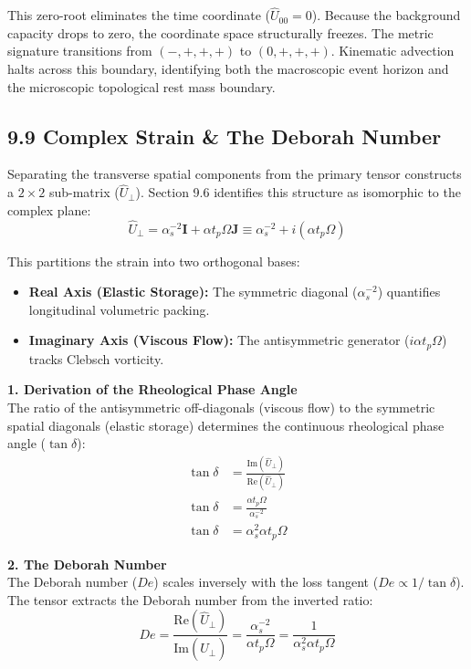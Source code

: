 This zero-root eliminates the time coordinate ($\hat{U}_{00} = 0$). Because the background capacity drops to zero, the coordinate space structurally freezes. The metric signature transitions from $(-,+,+,+)$ to $(0,+,+,+)$. Kinematic advection halts across this boundary, identifying both the macroscopic event horizon and the microscopic topological rest mass boundary.

\subsection*{9.9 Complex Strain \& The Deborah Number} 

Separating the transverse spatial components from the primary tensor constructs a $2 \times 2$ sub-matrix ($\hat{U}_{\perp}$). Section 9.6 identifies this structure as isomorphic to the complex plane:
\begin{equation}
    \hat{U}_{\perp} = \alpha_s^{-2} \mathbf{I} + \alpha t_p \Omega \mathbf{J} \equiv \alpha_s^{-2} + i (\alpha t_p \Omega)
\end{equation}

This partitions the strain into two orthogonal bases:
\begin{itemize}
    \item \textbf{Real Axis (Elastic Storage):} The symmetric diagonal ($\alpha_s^{-2}$) quantifies longitudinal volumetric packing.
    \item \textbf{Imaginary Axis (Viscous Flow):} The antisymmetric generator ($i \alpha t_p \Omega$) tracks Clebsch vorticity.
\end{itemize}

\textbf{1. Derivation of the Rheological Phase Angle} \\
The ratio of the antisymmetric off-diagonals (viscous flow) to the symmetric spatial diagonals (elastic storage) determines the continuous rheological phase angle ($\tan \delta$): 
\begin{align}
    \tan \delta &= \frac{\text{Im}(\hat{U}_{\perp})}{\text{Re}(\hat{U}_{\perp})} \nonumber \\
    \tan \delta &= \frac{\alpha t_p \Omega}{\alpha_s^{-2}} \nonumber \\
    \tan \delta &= \alpha_s^2 \alpha t_p \Omega
\end{align}

\textbf{2. The Deborah Number} \\
The Deborah number ($De$) scales inversely with the loss tangent ($De \propto 1/\tan \delta$). The tensor extracts the Deborah number from the inverted ratio:
\begin{equation}
    De = \frac{\text{Re}(\hat{U}_{\perp})}{\text{Im}(\hat{U}_{\perp})} = \frac{\alpha_s^{-2}}{\alpha t_p \Omega} = \frac{1}{\alpha_s^2 \alpha t_p \Omega} \label{eq:geometric_deborah} 
\end{equation}

